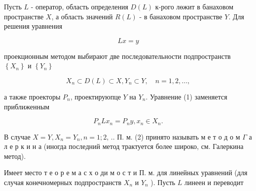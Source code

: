 \documentclass[10pt]{article}
\begin{document}
Пусть $L$ - оператор, область определения $D(L)$ к-рого лөжит в банаховом пространстве $X$, а область значений $R(L)$ - в банаховом пространстве $Y$. Для решения уравнения



\[

L x=y

\]



проекционным методом выбирают две последовательности подпространств $\left\{X_{n}\right\}$ и $\left\{Y_{n}\right\}$



\[

X_{n} \subset D(L) \subset X, Y_{n} \subset Y, \quad n=1,2, \ldots,

\]



а также проекторы $P_{n}$, проектируюпце $Y$ на $Y_{n}$. Уравнение (1) заменяется приближенным



\[

P_{n} L x_{n}=P_{n} y, x_{n} \in X_{n} .

\]



В случае $X=Y, X_{n}=Y_{n}, n=1 ; 2$, .. П. м. (2) принято называть м е т о д о м $\Gamma$ а л е р к и н а (иногда последний метод трактуется более широко, см. Галеркина метод).



Имеет место т е о р е м а с х о ди м о с т и П. м. для линейных уравнений (для случая конечномерных подпространств $X_{n}$ и $Y_{n}$ ). Пусть $L$ линеен и переводит
\end{document}
